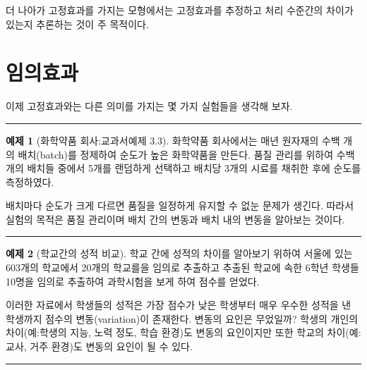 \documentclass[
]{book}
\theoremstyle{definition}
\theoremstyle{definition}
\newtheorem{example}{예제}[chapter]
\theoremstyle{definition}
\theoremstyle{remark}
\begin{document}
더 나아가 고정효과를 가지는 모형에서는 고정효과를 추정하고 처리 수준간의 차이가 있는지 추론하는 것이 주 목적이다.

\hypertarget{uxc784uxc758uxd6a8uxacfc}{%
\section{임의효과}\label{uxc784uxc758uxd6a8uxacfc}}

이제 고정효과와는 다른 의미를 가지는 몇 가지 실험들을 생각해 보자.

\begin{center}\rule{0.5\linewidth}{0.5pt}\end{center}

\begin{example}[화학약품 회사:교과서예제 3.3]
\protect\hypertarget{exm:unnamed-chunk-2}{}{\label{exm:unnamed-chunk-2} {} }화학약품 회사에서는 매년 원자재의 수백 개의 배치(batch)를 정제하여 순도가 높은 화학약품을 만든다. 품질 관리를 위하여 수백 개의 배치들 중에서 5개를 랜덤하게 선택하고 배치당 3개의 시료를 채취한 후에 순도를 측정하였다.

배치마다 순도가 크게 다르면 품질을 일정하게 유지할 수 없눈 문제가 생긴다. 따라서 실험의 목적은 품질 관리이며 배치 간의 변동과 배치 내의 변동을 알아보는 것이다.
\end{example}

\begin{center}\rule{0.5\linewidth}{0.5pt}\end{center}

\begin{example}[학교간의 성적 비교]
\protect\hypertarget{exm:unnamed-chunk-3}{}{\label{exm:unnamed-chunk-3} {} }학교 간에 성적의 차이를 알아보기 위하여 서울에 있는 603개의 학교에서 20개의 학교를을 임의로 추출하고 추출된 학교에 속한 6학년 학생들 10명을 임의로 추출하여 과학시험을 보게 하여 점수를 얻었다.

이러한 자료에서 학생들의 성적은 가장 점수가 낮은 학생부터 매우 우수한 성적을 낸 학생까지 점수의 변동(variation)이 존재한다. 변동의 요인은 무었일까? 학생의 개인의 차이(예:학생의 지능, 노력 정도, 학습 환경)도 변동의 요인이지만 또한 학교의 차이(예: 교사, 거주 환경)도 변동의 요인이 될 수 있다.
\end{example}

\begin{center}\rule{0.5\linewidth}{0.5pt}\end{center}
\end{document}
